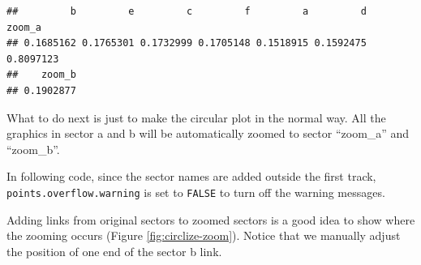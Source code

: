 \documentclass[]{book}
\newenvironment{Shaded}{\begin{snugshade}}{\end{snugshade}}
\newcommand{\KeywordTok}[1]{\textcolor[rgb]{0.13,0.29,0.53}{\textbf{#1}}}
\newcommand{\DataTypeTok}[1]{\textcolor[rgb]{0.13,0.29,0.53}{#1}}
\newcommand{\DecValTok}[1]{\textcolor[rgb]{0.00,0.00,0.81}{#1}}
\newcommand{\FloatTok}[1]{\textcolor[rgb]{0.00,0.00,0.81}{#1}}
\newcommand{\StringTok}[1]{\textcolor[rgb]{0.31,0.60,0.02}{#1}}
\newcommand{\OtherTok}[1]{\textcolor[rgb]{0.56,0.35,0.01}{#1}}
\newcommand{\ControlFlowTok}[1]{\textcolor[rgb]{0.13,0.29,0.53}{\textbf{#1}}}
\newcommand{\OperatorTok}[1]{\textcolor[rgb]{0.81,0.36,0.00}{\textbf{#1}}}
\newcommand{\NormalTok}[1]{#1}
\theoremstyle{definition}
\theoremstyle{definition}
\theoremstyle{remark}
\begin{document}
\begin{verbatim}
##         b         e         c         f         a         d    zoom_a 
## 0.1685162 0.1765301 0.1732999 0.1705148 0.1518915 0.1592475 0.8097123 
##    zoom_b 
## 0.1902877
\end{verbatim}

What to do next is just to make the circular plot in the normal way. All
the graphics in sector a and b will be automatically zoomed to sector
``zoom\_a'' and ``zoom\_b''.

In following code, since the sector names are added outside the first
track, \texttt{points.overflow.warning} is set to \texttt{FALSE} to turn
off the warning messages.

\begin{Shaded}
\end{Shaded}

Adding links from original sectors to zoomed sectors is a good idea to
show where the zooming occurs (Figure \ref{fig:circlize-zoom}). Notice
that we manually adjust the position of one end of the sector b link.
\end{document}
